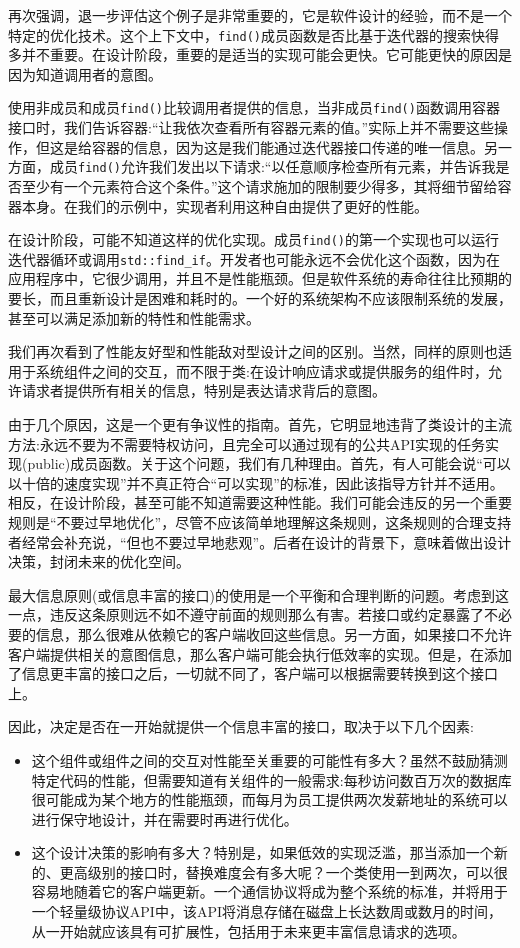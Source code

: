 再次强调，退一步评估这个例子是非常重要的，它是软件设计的经验，而不是一个特定的优化技术。这个上下文中，\texttt{find()}成员函数是否比基于迭代器的搜索快得多并不重要。在设计阶段，重要的是适当的实现可能会更快。它可能更快的原因是因为知道调用者的意图。 

使用非成员和成员\texttt{find()}比较调用者提供的信息，当非成员\texttt{find()}函数调用容器接口时，我们告诉容器:“让我依次查看所有容器元素的值。”实际上并不需要这些操作，但这是给容器的信息，因为这是我们能通过迭代器接口传递的唯一信息。另一方面，成员\texttt{find()}允许我们发出以下请求:“以任意顺序检查所有元素，并告诉我是否至少有一个元素符合这个条件。”这个请求施加的限制要少得多，其将细节留给容器本身。在我们的示例中，实现者利用这种自由提供了更好的性能。

在设计阶段，可能不知道这样的优化实现。成员\texttt{find()}的第一个实现也可以运行迭代器循环或调用\texttt{std::find\_if}。开发者也可能永远不会优化这个函数，因为在应用程序中，它很少调用，并且不是性能瓶颈。但是软件系统的寿命往往比预期的要长，而且重新设计是困难和耗时的。一个好的系统架构不应该限制系统的发展，甚至可以满足添加新的特性和性能需求。

我们再次看到了性能友好型和性能敌对型设计之间的区别。当然，同样的原则也适用于系统组件之间的交互，而不限于类:在设计响应请求或提供服务的组件时，允许请求者提供所有相关的信息，特别是表达请求背后的意图。

由于几个原因，这是一个更有争议性的指南。首先，它明显地违背了类设计的主流方法:永远不要为不需要特权访问，且完全可以通过现有的公共API实现的任务实现(public)成员函数。关于这个问题，我们有几种理由。首先，有人可能会说“可以以十倍的速度实现”并不真正符合“可以实现”的标准，因此该指导方针并不适用。相反，在设计阶段，甚至可能不知道需要这种性能。我们可能会违反的另一个重要规则是“不要过早地优化”，尽管不应该简单地理解这条规则，这条规则的合理支持者经常会补充说，“但也不要过早地悲观”。后者在设计的背景下，意味着做出设计决策，封闭未来的优化空间。

最大信息原则(或信息丰富的接口)的使用是一个平衡和合理判断的问题。考虑到这一点，违反这条原则远不如不遵守前面的规则那么有害。若接口或约定暴露了不必要的信息，那么很难从依赖它的客户端收回这些信息。另一方面，如果接口不允许客户端提供相关的意图信息，那么客户端可能会执行低效率的实现。但是，在添加了信息更丰富的接口之后，一切就不同了，客户端可以根据需要转换到这个接口上。

因此，决定是否在一开始就提供一个信息丰富的接口，取决于以下几个因素: 

\begin{itemize}
\item 
这个组件或组件之间的交互对性能至关重要的可能性有多大？虽然不鼓励猜测特定代码的性能，但需要知道有关组件的一般需求:每秒访问数百万次的数据库很可能成为某个地方的性能瓶颈，而每月为员工提供两次发薪地址的系统可以进行保守地设计，并在需要时再进行优化。

\item 
这个设计决策的影响有多大？特别是，如果低效的实现泛滥，那当添加一个新的、更高级别的接口时，替换难度会有多大呢？一个类使用一到两次，可以很容易地随着它的客户端更新。一个通信协议将成为整个系统的标准，并将用于一个轻量级协议API中，该API将消息存储在磁盘上长达数周或数月的时间，从一开始就应该具有可扩展性，包括用于未来更丰富信息请求的选项。
\end{itemize}

